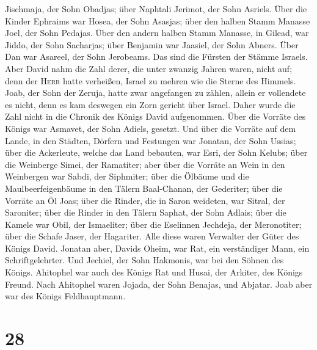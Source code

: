 Jischmaja, der Sohn Obadjas; über Naphtali Jerimot, der Sohn Asriels.
 Über die Kinder Ephraims war Hosea, der Sohn Asasjas;
über den halben Stamm Manasse Joel, der Sohn Pedajas. 
Über den andern halben Stamm Manasse, in Gilead, war Jiddo, der Sohn
Sacharjas; über Benjamin war Jaasiel, der Sohn Abners. 
Über Dan war Asareel, der Sohn Jerobeams. Das sind die Fürsten der
Stämme Israels.  Aber David nahm die Zahl derer, die
unter zwanzig Jahren waren, nicht auf; denn der \textsc{Herr} hatte
verheißen, Israel zu mehren wie die Sterne des Himmels. 
Joab, der Sohn der Zeruja, hatte zwar angefangen zu zählen, allein er
vollendete es nicht, denn es kam deswegen ein Zorn gericht über Israel.
Daher wurde die Zahl nicht in die Chronik des Königs David aufgenommen.
 Über die Vorräte des Königs war Asmavet, der Sohn
Adiels, gesetzt. Und über die Vorräte auf dem Lande, in den Städten,
Dörfern und Festungen war Jonatan, der Sohn Ussias;  über
die Ackerleute, welche das Land bebauten, war Esri, der Sohn Kelubs;
 über die Weinberge Simei, der Ramatiter; aber über die
Vorräte an Wein in den Weinbergen war Sabdi, der Siphmiter;
 über die Ölbäume und die Maulbeerfeigenbäume in den
Tälern Baal-Chanan, der Gederiter; über die Vorräte an Öl Joas;
 über die Rinder, die in Saron weideten, war Sitral, der
Saroniter; über die Rinder in den Tälern Saphat, der Sohn Adlais;
 über die Kamele war Obil, der Ismaeliter; über die
Eselinnen Jechdeja, der Meronotiter;  über die Schafe
Jaser, der Hagariter. Alle diese waren Verwalter der Güter des Königs
David.  Jonatan aber, Davids Oheim, war Rat, ein
verständiger Mann, ein Schriftgelehrter. Und Jechiel, der Sohn Hakmonis,
war bei den Söhnen des Königs.  Ahitophel war auch des
Königs Rat und Husai, der Arkiter, des Königs Freund. 
Nach Ahitophel waren Jojada, der Sohn Benajas, und Abjatar. Joab aber
war des Königs Feldhauptmann.

\hypertarget{section-27}{%
\section{28}\label{section-27}}

